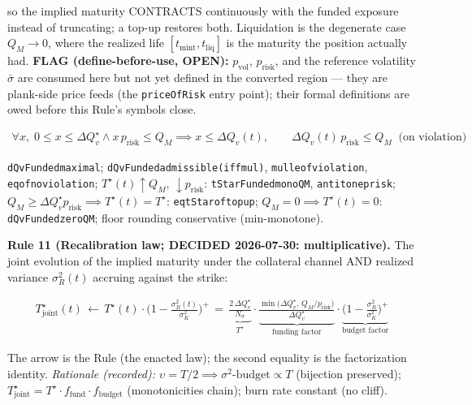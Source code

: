 \documentclass[11pt]{article}
\renewcommand{\_}{\textunderscore\allowbreak}
\begin{document}
so the implied maturity CONTRACTS continuously with the funded exposure instead of truncating; a top-up restores both. Liquidation is the degenerate case \(Q_M \to 0\), where the realized life \([t_{\text{mint}}, t_{\text{liq}}]\) is the maturity the position actually had. \textbf{FLAG (define-before-use, OPEN):} \(p_{\text{vol}}\), \(p_{\text{risk}}\), and the reference volatility \(\bar\sigma\) are consumed here but not yet defined in the converted region --- they are plank-side price feeds (the \texttt{priceOfRisk} entry point); their formal definitions are owed before this Rule's symbols close.

\[
    \begin{aligned}
        \forall x,\; 0 \leq x \leq \Delta Q_v^{\star} \wedge x\, p_{\text{risk}} \leq Q_M \implies x \leq \Delta Q_v(t), \qquad \Delta Q_v(t)\, p_{\text{risk}} \leq Q_M \;\;\text{(on violation)}
    \end{aligned}
\]

\texttt{dQvFunded\_maximal}; \texttt{dQvFunded\_admissible(\_iff\_mul)}, \texttt{\_mul\_le\_of\_violation}, \texttt{\_eq\_of\_no\_violation}; \(T^{\star}(t) \uparrow Q_M,\, \downarrow p_{\text{risk}}\): \texttt{tStarFunded\_mono\_QM}, \texttt{\_antitone\_prisk}; \(Q_M \geq \Delta Q_v^{\star} p_{\text{risk}} \implies T^{\star}(t) = T^{\star}\): \texttt{\_eq\_tStar\_of\_topup}; \(Q_M = 0 \implies T^{\star}(t) = 0\): \texttt{dQvFunded\_zero\_QM}; floor rounding conservative (min-monotone).

\textbf{Rule 11 (Recalibration law; DECIDED 2026-07-30: multiplicative).} The joint evolution of the implied maturity under the collateral channel AND realized variance \(\sigma^2_R(t)\) accruing against the strike:

\[
    \begin{aligned}
        T^{\star}_{\text{joint}}(t) \, \leftarrow \, T^{\star}(t)\cdot\Big(1 - \frac{\sigma^2_R(t)}{\sigma^2_K}\Big)^{+} \, = \, \underbrace{\frac{2\,\Delta Q_v^{\star}}{N_\sigma}}_{T^{\star}} \cdot \underbrace{\frac{\min\big(\Delta Q_v^{\star},\, Q_M/p_{\text{risk}}\big)}{\Delta Q_v^{\star}}}_{\text{funding factor}} \cdot \underbrace{\Big(1 - \frac{\sigma^2_R}{\sigma^2_K}\Big)^{+}}_{\text{budget factor}}
    \end{aligned}
\]

The arrow is the Rule (the enacted law); the second equality is the factorization identity. \emph{Rationale (recorded):} \(\upsilon = T/2 \implies \sigma^2\text{-budget} \propto T\) (bijection preserved); \(T^{\star}_{\text{joint}} = T^{\star}\cdot f_{\text{fund}}\cdot f_{\text{budget}}\) (monotonicities chain); burn rate constant (no cliff).
\end{document}
